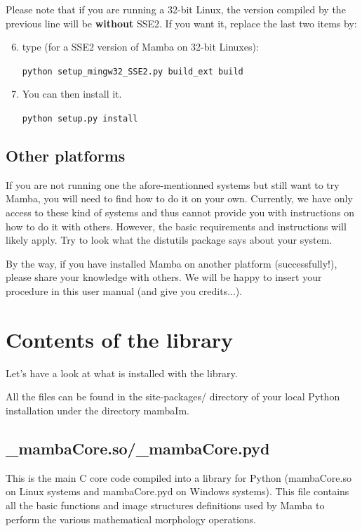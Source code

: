 \documentclass[a4paper,10pt,oneside]{article}
\begin{document}
Please note that if you are running a 32-bit Linux, the version compiled by the
previous line will be \textbf{without} SSE2. If you want it, replace the last 
two items by:

\begin{enumerate}
\setcounter{enumi}{5}
\item type (for a SSE2 version of Mamba on 32-bit Linuxes):

\texttt{python setup\_mingw32\_SSE2.py build\_ext build}

\item You can then install it.

\texttt{python setup.py install}

\end{enumerate}


\subsection{Other platforms}

If you are not running one the afore-mentionned systems but still want to try
Mamba, you will need to find how to do it on your own. Currently, we have only access to
these kind of systems and thus cannot provide you with instructions on how to do
it with others. However, the basic requirements and instructions will likely apply.
Try to look what the distutils package says about your system.

By the way, if you have installed Mamba on another platform (successfully!), please
share your knowledge with others. We will be happy to insert your procedure in this
user manual (and give you credits...).

\pagebreak

\section{Contents of the library}
\label{cha:content}

Let's have a look at what is installed with the library.

All the files can be found in the site-packages/ directory of your local
Python installation under the directory mambaIm.

\subsection{\_mambaCore.so/\_mambaCore.pyd}

This is the main C core code compiled into a library for Python (mambaCore.so on
Linux systems and mambaCore.pyd on Windows systems). This file contains all the
basic functions and image structures definitions used by Mamba to perform the 
various mathematical morphology operations.
\end{document}
